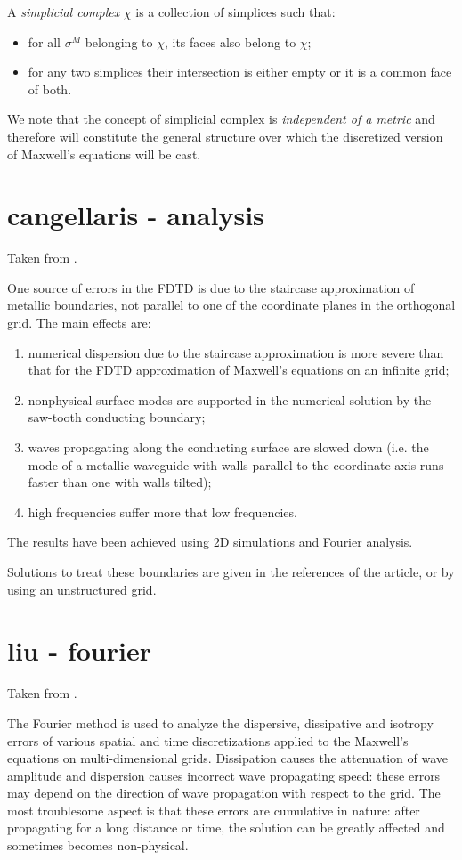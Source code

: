 A \emph{simplicial complex} $\chi$ is a collection of simplices such
that:
\begin{itemize}
\item
  for all $\sigma^M$ belonging to $\chi$, its faces also belong to
  $\chi$;
\item
  for any two simplices their intersection is either empty or it is a
  common face of both.
\end{itemize}
We note that the concept of simplicial complex is \emph{independent of
  a metric} and therefore will constitute the general structure over
which the discretized version of Maxwell's equations will be cast.






\section{cangellaris - analysis}
Taken from \cite{cangellaris_analysis}.

One source of errors in the FDTD is due to the staircase approximation
of metallic boundaries, not parallel to one of the coordinate planes
in the orthogonal grid. The main effects are:
\begin{enumerate}
\item
  numerical dispersion due to the staircase approximation is more
  severe than that for the FDTD approximation of Maxwell's equations
  on an infinite grid;
\item
  nonphysical surface modes are supported in the numerical solution by
  the saw-tooth conducting boundary;
\item
  waves propagating along the conducting surface are slowed down
  (i.e. the mode of a metallic waveguide with walls parallel to the
  coordinate axis runs faster than one with walls tilted);
\item
  high frequencies suffer more that low frequencies.
\end{enumerate}
The results have been achieved using 2D simulations and Fourier
analysis.

Solutions to treat these boundaries are given in the references of the
article, or by using an unstructured grid.

\section{liu - fourier}
Taken from \cite{liu_fourier}.

The Fourier method is used to analyze the dispersive, dissipative and
isotropy errors of various spatial and time discretizations applied to
the Maxwell's equations on multi-dimensional grids. Dissipation causes
the attenuation of wave amplitude and dispersion causes incorrect wave
propagating speed: these errors may depend on the direction of wave
propagation with respect to the grid. The most troublesome aspect is
that these errors are cumulative in nature: after propagating for a
long distance or time, the solution can be greatly affected and
sometimes becomes non-physical.

